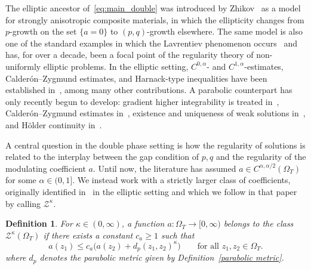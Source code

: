 \documentclass[10pt,a4paper]{amsart}
\newtheorem{definition}[theorem]{Definition}
\numberwithin{equation}{section}
\begin{document}
The elliptic ancestor of~\eqref{eq:main_double} was introduced by
Zhikov~\cite{Zhikov1986, Zhikov1993, Zhikov1995, Zhikov1997} as a model for
strongly anisotropic composite materials, in which the ellipticity changes
from $p$-growth on the set $\{a = 0\}$ to $(p, q)$-growth elsewhere. The
same model is also one of the standard examples in which the Lavrentiev
phenomenon occurs~\cite{Esposito2004, Fonseca2004, Zhikov1993, Zhikov1995} and has,
for over a decade, been a focal point of the regularity theory of
non-uniformly elliptic problems. In the elliptic setting,
$C^{0, \alpha}$- and $C^{1, \alpha}$-estimates, Calder\'on--Zygmund
estimates, and Harnack-type inequalities have been established
in~\cite{Baroni2015, Colombo2015, Colombo2015a, Colombo2016, DeFilippis2019,
Baasandorj2020, Byun2020, Byun2017}, among many other contributions. A
parabolic counterpart has only recently begun to develop: gradient higher integrability is treated
in~\cite{2023_Gradient_Higher_Integrability_for_Degenerate_Parabolic_Double-Phase_Systems,
KS24, S25, KO2025, kim2026interpolativerefinementgapbound, oh2026gradienthigherintegrabilitydegenerate, arora2026irregulardoublephaseevolution}, Calder\'on--Zygmund estimates in~\cite{kim2024calderonzygmundtypeestimateparabolic,
kim2025calderonzygmundtypeestimatesingular}, existence and uniqueness of
weak solutions in~\cite{ST16, KimLipschitz25}, and H\"older continuity
in~\cite{Kim2025holder}.

A central question in the double phase setting is how the regularity of solutions is related to
the interplay between the gap condition of $p, q$ and the regularity of the
modulating coefficient $a$. Until now, the literature has assumed $a \in C^{\alpha,
\alpha/2}(\Omega_T)$ for some $\alpha \in (0, 1]$. We instead work with a
strictly larger class of coefficients, originally identified
in~\cite{BCFM2023} in the elliptic setting and which we follow in that paper
by calling $\mathcal{Z}^{\kappa}$.

\begin{definition}\label{def:Zkappa}
For $\kappa \in (0, \infty)$, a function $a : \Omega_T \to [0, \infty)$
belongs to the class $\mathcal{Z}^{\kappa}(\Omega_T)$ if there exists a
constant $c_a \ge 1$ such that
\begin{equation}\label{eq:Z_kappa}
  a(z_1) \le c_a\bigl(a(z_2) + d_p(z_1,z_2)^{\kappa}\bigr)
  \qquad \text{for all } z_1, z_2 \in \Omega_T.
\end{equation}
where $d_p$ denotes the parabolic metric given by Definition~\ref{parabolic metric}.
\end{definition}
\end{document}
